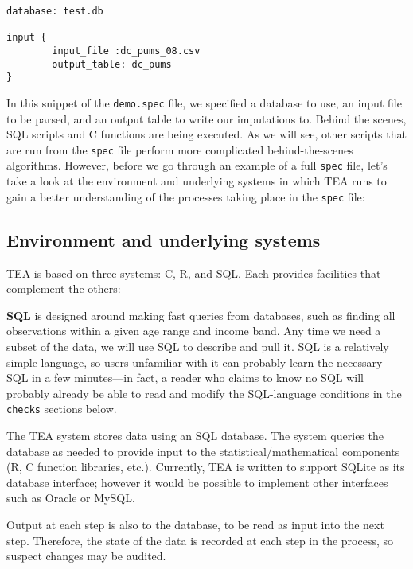 \documentclass{article}
\begin{document}
\begin{verbatim}
database: test.db

input {
        input_file :dc_pums_08.csv
        output_table: dc_pums
}
\end{verbatim}

In this snippet of the {\tt demo.spec} file, we specified a database to use, an input 
file to be parsed, and an output table to write our imputations to. Behind the scenes, 
SQL scripts and C functions are being executed. As we will see, other scripts that are 
run from the {\tt spec} file perform more complicated behind-the-scenes algorithms. 
However, before we go through an example of a full {\tt spec} file, let's take a look at 
the environment and underlying systems in which TEA runs to gain a better understanding 
of the processes taking place in the {\tt spec} file:

\subsection{Environment and underlying systems}
TEA is based on three systems: C, R, and SQL. Each provides facilities that complement the others:

{\bf SQL} is designed around making fast queries from databases, such as finding all
observations within a given age range and income band. Any time we need a subset of the
data, we will use SQL to describe and pull it. SQL is a relatively simple language, so
users unfamiliar with it can probably learn the necessary SQL in a few
minutes---in fact, a reader who claims to know no SQL will probably already be able
to read and modify the SQL-language conditions in the {\tt checks} sections below.

The TEA system stores data using an SQL database. The system queries the database as
needed to provide input to the statistical/mathematical components (R, C function libraries, etc.).
Currently, TEA is written to support SQLite as its database interface; however it would
be possible to implement other interfaces such as Oracle or MySQL.

Output at each step is also to the database, to be read as input into the next
step. Therefore, the state of the data is recorded at each step in the process, so
suspect changes may be audited.
\end{document}
